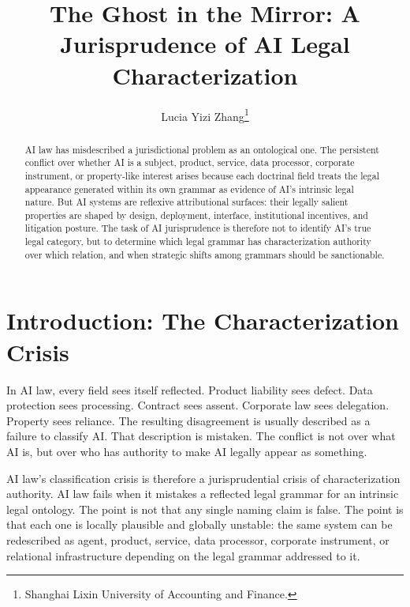 \documentclass{lawreview}
\title{The Ghost in the Mirror: A Jurisprudence of AI Legal Characterization}
\author{Lucia Yizi Zhang\thanks{Shanghai Lixin University of Accounting and Finance.}}
\begin{document}

    \maketitle

    \begin{abstract}
        AI law has misdescribed a jurisdictional problem as an ontological one. The persistent conflict over whether AI is a subject, product, service, data processor, corporate instrument, or property-like interest arises because each doctrinal field treats the legal appearance generated within its own grammar as evidence of AI's intrinsic legal nature. But AI systems are reflexive attributional surfaces: their legally salient properties are shaped by design, deployment, interface, institutional incentives, and litigation posture. The task of AI jurisprudence is therefore not to identify AI's true legal category, but to determine which legal grammar has characterization authority over which relation, and when strategic shifts among grammars should be sanctionable.
    \end{abstract}

    \tableofcontents
    \newpage


    \section*{Introduction: The Characterization Crisis}

    In AI law, every field sees itself reflected. Product liability sees defect. Data protection sees processing. Contract sees assent. Corporate law sees delegation. Property sees reliance. The resulting disagreement is usually described as a failure to classify AI. That description is mistaken. The conflict is not over what AI is, but over who has authority to make AI legally appear as something.

    AI law's classification crisis is therefore a jurisprudential crisis of characterization authority. AI law fails when it mistakes a reflected legal grammar for an intrinsic legal ontology. The point is not that any single naming claim is false. The point is that each one is locally plausible and globally unstable: the same system can be redescribed as agent, product, service, data processor, corporate instrument, or relational infrastructure depending on the legal grammar addressed to it.
\end{document}
